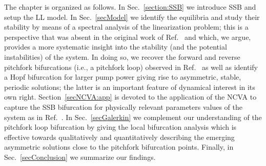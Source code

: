 The chapter is organized as follows.
%
In Sec.~\ref{section:SSB} we introduce SSB and setup the LL model.  In Sec.~\ref{secModel} we identify the equilibria and study their stability by means 
of a spectral analysis of the linearization problem; this is a perspective
that was absent in the original work of Ref.~\cite{XuCoen} and which, we 
argue, provides a more systematic insight into the stability (and the
potential instabilities) of the system. 
In doing so, we recover the forward and reverse 
pitchfork bifurcations (i.e., a pitchfork loop) observed in Ref.~\cite{XuCoen} as well 
as identify a Hopf bifurcation for larger pump power giving rise to asymmetric,
stable, periodic solutions; the latter is an important feature of 
dynamical interest
in its own right.
%
%
Section~\ref{secNCVA:app} is devoted to the application of the NCVA to capture
the SSB bifurcation for physically relevant parameters values of the system 
as in Ref.~\cite{XuCoen}.
%
In Sec.~\ref{secGalerkin} we complement our understanding of the pitchfork
loop bifurcation by giving the local bifurcation analysis which is effective 
towards qualitatively and quantitatively describing the emerging asymmetric solutions
close to the pitchfork bifurcation points. 
%
Finally, in Sec.~\ref{secConclusion} we summarize
our findings.

